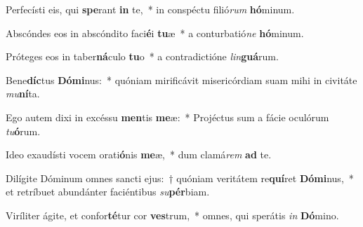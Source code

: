 \item Perfecísti eis, qui \textbf{spe}rant \textbf{in} te,~* in conspéctu filió\textit{rum} \textbf{hó}minum.
\item Abscóndes eos in abscóndito faci\textbf{é}i \textbf{tu}æ~* a conturbatió\textit{ne} \textbf{hó}minum.
\item Próteges eos in taber\textbf{ná}culo \textbf{tu}o~* a contradictióne \textit{lin}\textbf{guá}rum.
\item Bene\textbf{díc}tus \textbf{Dó}\textbf{mi}nus:~* quóniam mirificávit misericórdiam suam mihi in civitáte \textit{mu}\textbf{ní}ta.
\item Ego autem dixi in excéssu \textbf{men}tis \textbf{me}æ:~* Projéctus sum a fácie oculórum \textit{tu}\textbf{ó}rum.
\item Ideo exaudísti vocem orati\textbf{ó}nis \textbf{me}æ,~* dum clamá\textit{rem} \textbf{ad} te.
\item Dilígite Dóminum omnes sancti ejus:~† quóniam veritátem re\textbf{quí}ret \textbf{Dó}\textbf{mi}nus,~* et retríbuet abundánter faciéntibus \textit{su}\textbf{pér}biam.
\item Viríliter ágite, et confor\textbf{té}tur cor \textbf{ves}trum,~* omnes, qui sperátis \textit{in} \textbf{Dó}mino.
